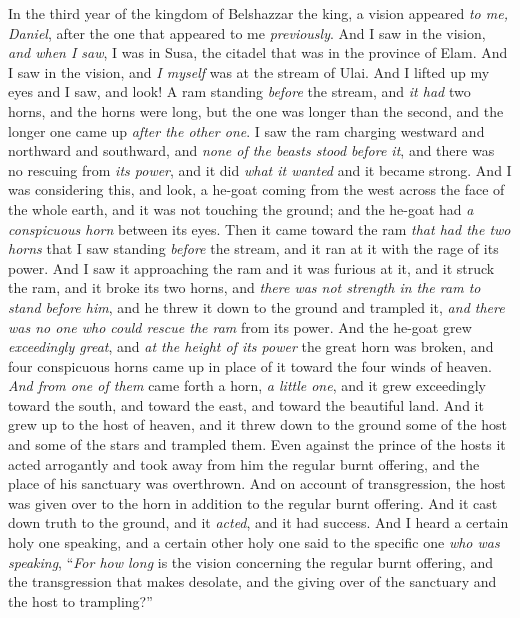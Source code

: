 \begin{biblechapter} %
 In the third year of the kingdom of Belshazzar the king, a vision appeared \textit{to me, Daniel}, after the one that appeared to me \textit{previously}.
\verse And I saw in the vision, \textit{and when I saw}, I was in Susa, the citadel that was in the province of Elam. And I saw in the vision, and \textit{I myself} was at the stream of Ulai.
\verse And I lifted up my eyes and I saw, and look! A ram standing \textit{before} the stream, and \textit{it had} two horns, and the horns were long, but the one was longer than the second, and the longer one came up \textit{after the other one}.
\verse I saw the ram charging westward and northward and southward, and \textit{none of the beasts stood before it}, and there was no rescuing from \textit{its power}, and it did \textit{what it wanted} and it became strong.
\verse And I was considering this, and look, a he-goat coming from the west across the face of the whole earth, and it was not touching the ground; and the he-goat had \textit{a conspicuous horn} between its eyes.
\verse Then it came toward the ram \textit{that had the two horns} that I saw standing \textit{before} the stream, and it ran at it with the rage of its power.
\verse And I saw it approaching the ram and it was furious at it, and it struck the ram, and it broke its two horns, and \textit{there was not strength in the ram to stand before him}, and he threw it down to the ground and trampled it, \textit{and there was no one who could rescue the ram} from its power.
\verse And the he-goat grew \textit{exceedingly great}, and \textit{at the height of its power} the great horn was broken, and four conspicuous horns came up in place of it toward the four winds of heaven.
\verse \textit{And from one of them} came forth a horn, \textit{a little one}, and it grew exceedingly toward the south, and toward the east, and toward the beautiful land.
\verse And it grew up to the host of heaven, and it threw down to the ground some of the host and some of the stars and trampled them.
\verse Even against the prince of the hosts it acted arrogantly and took away from him the regular burnt offering, and the place of his sanctuary was overthrown.
\verse And on account of transgression, the host was given over to the horn in addition to the regular burnt offering. And it cast down truth to the ground, and it \textit{acted}, and it had success.
\verse And I heard a certain holy one speaking, and a certain other holy one said to the specific one \textit{who was speaking}, “\textit{For how long} is the vision concerning the regular burnt offering, and the transgression that makes desolate, and the giving over of the sanctuary and the host to trampling?”

\end{biblechapter}
